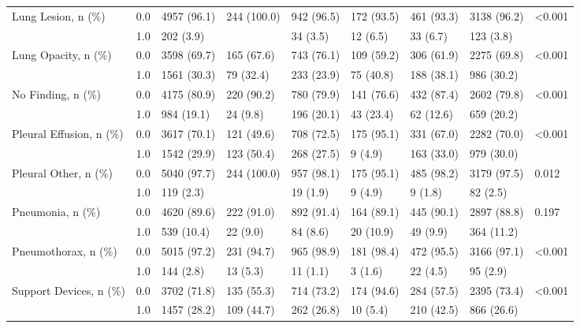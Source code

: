 \begin{tabular}{lllllllll}
Lung Lesion, n (\%) & 0.0 &            4957 (96.1) &  244 (100.0) &  942 (96.5) &      172 (93.5) &  461 (93.3) &  3138 (96.2) &  <0.001 \\
                       & 1.0 &              202 (3.9) &              &    34 (3.5) &        12 (6.5) &    33 (6.7) &    123 (3.8) &         \\
Lung Opacity, n (\%) & 0.0 &            3598 (69.7) &   165 (67.6) &  743 (76.1) &      109 (59.2) &  306 (61.9) &  2275 (69.8) &  <0.001 \\
                       & 1.0 &            1561 (30.3) &    79 (32.4) &  233 (23.9) &       75 (40.8) &  188 (38.1) &   986 (30.2) &         \\
No Finding, n (\%) & 0.0 &            4175 (80.9) &   220 (90.2) &  780 (79.9) &      141 (76.6) &  432 (87.4) &  2602 (79.8) &  <0.001 \\
                       & 1.0 &             984 (19.1) &     24 (9.8) &  196 (20.1) &       43 (23.4) &   62 (12.6) &   659 (20.2) &         \\
Pleural Effusion, n (\%) & 0.0 &            3617 (70.1) &   121 (49.6) &  708 (72.5) &      175 (95.1) &  331 (67.0) &  2282 (70.0) &  <0.001 \\
                       & 1.0 &            1542 (29.9) &   123 (50.4) &  268 (27.5) &         9 (4.9) &  163 (33.0) &   979 (30.0) &         \\
Pleural Other, n (\%) & 0.0 &            5040 (97.7) &  244 (100.0) &  957 (98.1) &      175 (95.1) &  485 (98.2) &  3179 (97.5) &   0.012 \\
                       & 1.0 &              119 (2.3) &              &    19 (1.9) &         9 (4.9) &     9 (1.8) &     82 (2.5) &         \\
Pneumonia, n (\%) & 0.0 &            4620 (89.6) &   222 (91.0) &  892 (91.4) &      164 (89.1) &  445 (90.1) &  2897 (88.8) &   0.197 \\
                       & 1.0 &             539 (10.4) &     22 (9.0) &    84 (8.6) &       20 (10.9) &    49 (9.9) &   364 (11.2) &         \\
Pneumothorax, n (\%) & 0.0 &            5015 (97.2) &   231 (94.7) &  965 (98.9) &      181 (98.4) &  472 (95.5) &  3166 (97.1) &  <0.001 \\
                       & 1.0 &              144 (2.8) &     13 (5.3) &    11 (1.1) &         3 (1.6) &    22 (4.5) &     95 (2.9) &         \\
Support Devices, n (\%) & 0.0 &            3702 (71.8) &   135 (55.3) &  714 (73.2) &      174 (94.6) &  284 (57.5) &  2395 (73.4) &  <0.001 \\
                       & 1.0 &            1457 (28.2) &   109 (44.7) &  262 (26.8) &        10 (5.4) &  210 (42.5) &   866 (26.6) &         \\
\bottomrule
\end{tabular}
